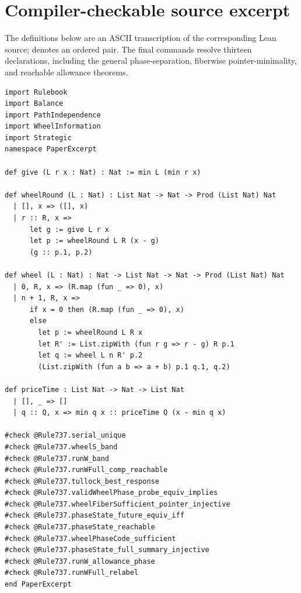 \documentclass[11pt]{article}
\theoremstyle{definition}
\theoremstyle{remark}
\newcommand{\codeunderscore}{\char`\_\allowbreak}
\newcommand{\lean}[1]{\ifmmode\mathtt{#1}\else{\ttfamily\let\_\codeunderscore #1}\fi}
\begin{document}
\section{Compiler-checkable source excerpt}
The definitions below are an ASCII transcription of the corresponding Lean source; \lean{Prod} denotes an ordered pair. The final \lean{\#check} commands resolve thirteen declarations, including the general phase-separation, fiberwise pointer-minimality, and reachable allowance theorems.
\begin{lstlisting}[basicstyle=\ttfamily\scriptsize]
import Rulebook
import Balance
import PathIndependence
import WheelInformation
import Strategic
namespace PaperExcerpt

def give (L r x : Nat) : Nat := min L (min r x)

def wheelRound (L : Nat) : List Nat -> Nat -> Prod (List Nat) Nat
  | [], x => ([], x)
  | r :: R, x =>
      let g := give L r x
      let p := wheelRound L R (x - g)
      (g :: p.1, p.2)

def wheel (L : Nat) : Nat -> List Nat -> Nat -> Prod (List Nat) Nat
  | 0, R, x => (R.map (fun _ => 0), x)
  | n + 1, R, x =>
      if x = 0 then (R.map (fun _ => 0), x)
      else
        let p := wheelRound L R x
        let R' := List.zipWith (fun r g => r - g) R p.1
        let q := wheel L n R' p.2
        (List.zipWith (fun a b => a + b) p.1 q.1, q.2)

def priceTime : List Nat -> Nat -> List Nat
  | [], _ => []
  | q :: Q, x => min q x :: priceTime Q (x - min q x)

#check @Rule737.serial_unique
#check @Rule737.wheelS_band
#check @Rule737.runW_band
#check @Rule737.runWFull_comp_reachable
#check @Rule737.tullock_best_response
#check @Rule737.validWheelPhase_probe_equiv_implies
#check @Rule737.wheelFiberSufficient_pointer_injective
#check @Rule737.phaseState_future_equiv_iff
#check @Rule737.phaseState_reachable
#check @Rule737.wheelPhaseCode_sufficient
#check @Rule737.phaseState_full_summary_injective
#check @Rule737.runW_allowance_phase
#check @Rule737.runWFull_relabel
end PaperExcerpt
\end{lstlisting}

\StrategicAppendix

\footnotesize
\setlength{\bibsep}{2pt}


\end{document}
